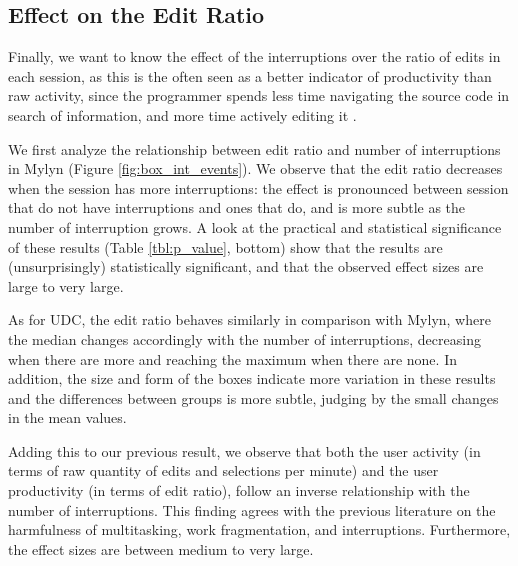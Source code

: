 \documentclass[times]{smrauth}
\begin{document}
\subsection{Effect on the Edit Ratio}
Finally, we want to know the effect of the interruptions over the ratio of edits in each session, as this is the often seen as a better indicator of productivity than raw activity, since the programmer spends less time navigating the source code in search of information, and more time actively editing it \cite{KM06}.

We first analyze the relationship between edit ratio and number of interruptions in Mylyn (Figure \ref{fig:box_int_events}). We observe that the edit ratio decreases when the session has more interruptions: the effect is pronounced between session that do not have interruptions and ones that do, and is more subtle as the number of interruption grows. A look at the practical and statistical significance of these results (Table \ref{tbl:p_value}, bottom) show that the results are (unsurprisingly) statistically significant, and that the observed effect sizes are large to very large.

As for UDC, the edit ratio behaves similarly in comparison with Mylyn, where the median changes accordingly with the number of interruptions, decreasing when there are more and reaching the maximum when there are none. In addition, the size and form of the boxes indicate more variation in these results and the differences between groups is more subtle, judging by the small changes in the mean values.

Adding this to our previous result, we observe that both the user activity (in terms of raw quantity of edits and selections per minute) and the user productivity (in terms of edit ratio), follow an inverse relationship with the number of interruptions. This finding agrees with the previous literature on the harmfulness of multitasking, work fragmentation, and interruptions. Furthermore, the effect sizes are between medium to very large.

\end{document}
